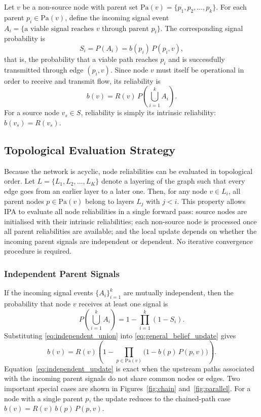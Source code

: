 \documentclass[preprint,12pt]{elsarticle}
\theoremstyle{definition}
\begin{document}
Let $v$ be a non-source node with parent set $\mathrm{Pa}(v)=\{p_1,p_2,\dots,p_k\}$. For each parent
$p_i\in \mathrm{Pa}(v)$, define the incoming signal event
$A_i=\{\text{a viable signal reaches } v \text{ through parent } p_i\}$. The corresponding signal
probability is
\begin{equation}\label{eq:signal}
S_i = P(A_i) = b(p_i)\,P(p_i,v),
\end{equation}
that is, the probability that a viable path reaches $p_i$ and is successfully transmitted through edge
$(p_i,v)$. Since node $v$ must itself be operational in order to receive and transmit flow, its
reliability is
\begin{equation}\label{eq:general_belief_update}
b(v)=R(v)\,P\!\left(\bigcup_{i=1}^{k}A_i\right).
\end{equation}
For a source node $v_s\in S$, reliability is simply its intrinsic reliability:
$b(v_s)=R(v_s)$.

\subsection{Topological Evaluation Strategy}

Because the network is acyclic, node reliabilities can be evaluated in topological order. Let
$L=\{L_1,L_2,\dots,L_K\}$ denote a layering of the graph such that every edge goes from an earlier layer
to a later one. Then, for any node $v\in L_i$, all parent nodes $p\in\mathrm{Pa}(v)$ belong to layers
$L_j$ with $j<i$. This property allows IPA to evaluate all node reliabilities in a single forward pass:
source nodes are initialised with their intrinsic reliabilities; each non-source node is processed once
all parent reliabilities are available; and the local update depends on whether the incoming parent
signals are independent or dependent. No iterative convergence procedure is required.

\subsubsection{Independent Parent Signals}

If the incoming signal events $\{A_i\}_{i=1}^{k}$ are mutually independent, then the probability that
node $v$ receives at least one signal is
\begin{equation}\label{eq:independent_union}
P\!\left(\bigcup_{i=1}^{k}A_i\right)=1-\prod_{i=1}^{k}(1-S_i).
\end{equation}
Substituting \eqref{eq:independent_union} into \eqref{eq:general_belief_update} gives
\begin{equation}\label{eq:independent_update}
b(v)=R(v)\left(1-\prod_{p\in\mathrm{Pa}(v)}\bigl(1-b(p)\,P(p,v)\bigr)\right).
\end{equation}
Equation~\eqref{eq:independent_update} is exact when the upstream paths associated with the incoming
parent signals do not share common nodes or edges. Two important special cases are shown in
Figures~\ref{fig:chain} and~\ref{fig:parallel}. For a node with a single parent $p$, the update reduces
to the chained-path case $b(v)=R(v)\,b(p)\,P(p,v)$.
\end{document}
